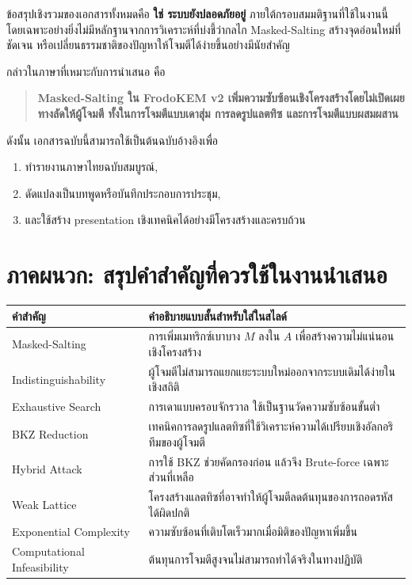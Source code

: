 \documentclass[12pt,a4paper]{article}
\newcommand{\term}[1]{\textbf{#1}}
\newcommand{\eng}[1]{\textenglish{#1}}
\begin{document}
	ข้อสรุปเชิงรวมของเอกสารทั้งหมดคือ \term{ใช่ ระบบยังปลอดภัยอยู่} ภายใต้กรอบสมมติฐานที่ใช้ในงานนี้ โดยเฉพาะอย่างยิ่งไม่มีหลักฐานจากการวิเคราะห์ที่บ่งชี้ว่ากลไก \eng{Masked-Salting} สร้างจุดอ่อนใหม่ที่ชัดเจน หรือเปลี่ยนธรรมชาติของปัญหาให้โจมตีได้ง่ายขึ้นอย่างมีนัยสำคัญ
	
	กล่าวในภาษาที่เหมาะกับการนำเสนอ คือ
	\begin{quote}
		\textbf{\eng{Masked-Salting} ใน \eng{FrodoKEM v2} เพิ่มความซับซ้อนเชิงโครงสร้างโดยไม่เปิดเผยทางลัดให้ผู้โจมตี ทั้งในการโจมตีแบบเดาสุ่ม การลดรูปแลตทิซ และการโจมตีแบบผสมผสาน}
	\end{quote}
	
	ดังนั้น เอกสารฉบับนี้สามารถใช้เป็นต้นฉบับอ้างอิงเพื่อ
	\begin{enumerate}[label=\arabic*.]
		\item ทำรายงานภาษาไทยฉบับสมบูรณ์,
		\item ดัดแปลงเป็นบทพูดหรือบันทึกประกอบการประชุม,
		\item และใช้สร้าง \eng{presentation} เชิงเทคนิคได้อย่างมีโครงสร้างและครบถ้วน
	\end{enumerate}
	
	\section*{ภาคผนวก: สรุปคำสำคัญที่ควรใช้ในงานนำเสนอ}
	
	\begin{longtable}{p{} p{}}
		\toprule
		คำสำคัญ & คำอธิบายแบบสั้นสำหรับใส่ในสไลด์ \\
		\midrule
		\eng{Masked-Salting} & การเพิ่มเมทริกซ์เบาบาง $M$ ลงใน $A$ เพื่อสร้างความไม่แน่นอนเชิงโครงสร้าง \\
		\eng{Indistinguishability} & ผู้โจมตีไม่สามารถแยกแยะระบบใหม่ออกจากระบบเดิมได้ง่ายในเชิงสถิติ \\
		\eng{Exhaustive Search} & การเดาแบบครอบจักรวาล ใช้เป็นฐานวัดความซับซ้อนขั้นต่ำ \\
		\eng{BKZ Reduction} & เทคนิคการลดรูปแลตทิซที่ใช้วิเคราะห์ความได้เปรียบเชิงอัลกอริทึมของผู้โจมตี \\
		\eng{Hybrid Attack} & การใช้ \eng{BKZ} ช่วยคัดกรองก่อน แล้วจึง \eng{Brute-force} เฉพาะส่วนที่เหลือ \\
		\eng{Weak Lattice} & โครงสร้างแลตทิซที่อาจทำให้ผู้โจมตีลดต้นทุนของการถอดรหัสได้ผิดปกติ \\
		\eng{Exponential Complexity} & ความซับซ้อนที่เติบโตเร็วมากเมื่อมิติของปัญหาเพิ่มขึ้น \\
		\eng{Computational Infeasibility} & ต้นทุนการโจมตีสูงจนไม่สามารถทำได้จริงในทางปฏิบัติ \\
		\bottomrule
	\end{longtable}
	
\end{document}
